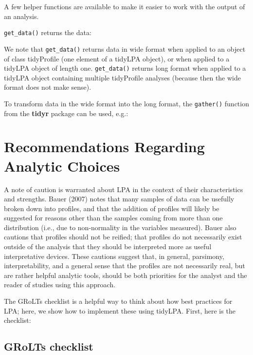 \documentclass[man]{apa6}
\begin{document}
A few helper functions are available to make it easier to work with the output
of an analysis.

\texttt{get\_data()} returns the data:

We note that \texttt{get\_data()} returns data in wide format when applied to an object
of class tidyProfile (one element of a tidyLPA object), or when applied to a
tidyLPA object of length one. \texttt{get\_data()} returns long format when applied to a
tidyLPA object containing multiple tidyProfile analyses (because then the wide
format does not make sense).

To transform data in the wide format into the long format, the \texttt{gather()}
function from the \textbf{tidyr} package can be used, e.g.:

\hypertarget{recommendations-regarding-analytic-choices}{%
\section{Recommendations Regarding Analytic Choices}\label{recommendations-regarding-analytic-choices}}

A note of caution is warranted about LPA in the context of their characteristics
and strengths. Bauer (2007) notes that many samples of data can be usefully
broken down into profiles, and that the addition of profiles will likely be
suggested for reasons other than the samples coming from more than one
distribution (i.e., due to non-normality in the variables measured). Bauer also
cautions that profiles should not be reified; that profiles do not necessarily
exist outside of the analysis that they should be interpreted more as useful
interpretative devices. These cautions suggest that, in general, parsimony,
interpretability, and a general sense that the profiles are not necessarily
real, but are rather helpful analytic tools, should be both priorities for the
analyst and the reader of studies using this approach.

The GRoLTs checklist is a helpful way to think about how best practices for LPA;
here, we show how to implement these using tidyLPA. First, here is the checklist:

\hypertarget{grolts-checklist}{%
\subsection{GRoLTs checklist}\label{grolts-checklist}}

\hypertarget{htmlwidget-675d126ab2afaf44720a}{}
\end{document}
